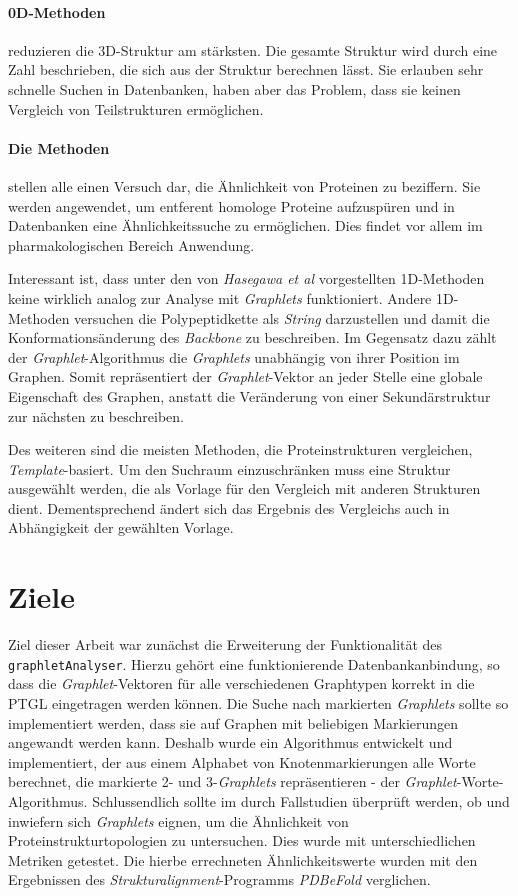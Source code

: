 \documentclass{report}
\begin{document}
\paragraph{0D-Methoden} reduzieren die 3D-Struktur am st\"arksten. Die gesamte Struktur wird durch eine Zahl beschrieben, die sich aus der Struktur berechnen l\"asst. Sie erlauben sehr schnelle Suchen in Datenbanken, haben aber das Problem, dass sie keinen Vergleich von Teilstrukturen erm\"oglichen.

\paragraph{Die Methoden} stellen alle einen Versuch dar, die \"Ahnlichkeit von Proteinen zu beziffern. Sie werden angewendet, um entferent homologe Proteine aufzusp\"uren und in Datenbanken eine \"Ahnlichkeitssuche zu erm\"oglichen. Dies findet vor allem im pharmakologischen Bereich Anwendung.

Interessant ist, dass unter den von \textit{Hasegawa et al} vorgestellten 1D-Methoden keine wirklich analog zur Analyse mit \textit{Graphlets} funktioniert. Andere 1D-Methoden versuchen die Polypeptidkette als \textit{String} darzustellen und damit die Konformations\"anderung des \textit{Backbone} zu beschreiben. Im Gegensatz dazu z\"ahlt der \textit{Graphlet}-Algorithmus die \textit{Graphlets} unabh\"angig von ihrer Position im Graphen. Somit repr\"asentiert der \textit{Graphlet}-Vektor an jeder Stelle eine globale Eigenschaft des Graphen, anstatt die Ver\"anderung von einer Sekund\"arstruktur zur n\"achsten zu beschreiben.

Des weiteren sind die meisten Methoden, die Proteinstrukturen vergleichen, \textit{Template}-basiert. Um den Suchraum einzuschr\"anken muss eine Struktur ausgew\"ahlt werden, die als Vorlage f\"ur den Vergleich mit anderen Strukturen dient. Dementsprechend \"andert sich das Ergebnis des Vergleichs auch in Abh\"angigkeit der gew\"ahlten Vorlage.



\section{Ziele}

Ziel dieser Arbeit war zun\"achst die Erweiterung der Funktionalit\"at des \texttt{graphletAnalyser}. Hierzu geh\"ort eine funktionierende Datenbankanbindung, so dass die \textit{Graphlet}-Vektoren f\"ur alle verschiedenen Graphtypen korrekt in die PTGL eingetragen werden k\"onnen.
Die Suche nach markierten \textit{Graphlets} sollte so implementiert werden, dass sie auf Graphen mit beliebigen Markierungen angewandt werden kann. Deshalb wurde ein Algorithmus entwickelt und implementiert, der aus einem Alphabet von Knotenmarkierungen alle Worte berechnet, die markierte  2- und 3-\textit{Graphlets} repr\"asentieren - der \textit{Graphlet}-Worte-Algorithmus.
Schlussendlich sollte im durch Fallstudien \"uberpr\"uft werden, ob und inwiefern sich \textit{Graphlets} eignen, um die \"Ahnlichkeit von Proteinstrukturtopologien zu untersuchen. Dies wurde mit unterschiedlichen Metriken getestet. Die hierbe errechneten \"Ahnlichkeitswerte wurden mit den Ergebnissen des \textit{Strukturalignment}-Programms \textit{PDBeFold} verglichen.
\end{document}

